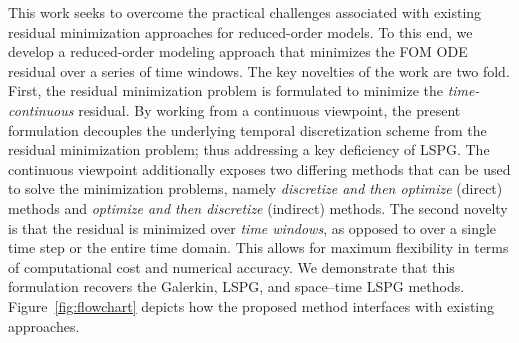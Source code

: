 \documentclass[3p,computermodern,10pt]{elsarticle}
\begin{document}
This work seeks to overcome the practical challenges associated with existing
residual minimization approaches for reduced-order models. To this end, we
develop a reduced-order modeling approach that minimizes the FOM ODE residual
over a series of time windows. The key novelties of the work are two fold.
First, the residual minimization problem is formulated to minimize the
\textit{time-continuous} residual. By working from a continuous viewpoint, the
present formulation decouples the underlying temporal discretization scheme
from the residual minimization problem; thus addressing a key deficiency of
LSPG. The continuous viewpoint additionally exposes two differing methods that
can be used to solve the minimization problems, namely \textit{discretize and
then optimize} (direct) methods and \textit{optimize and then discretize}
(indirect) methods. The second novelty is that the residual is minimized over
\textit{time windows}, as opposed to over a single time step or the entire
time domain. This allows for maximum flexibility in terms of computational
cost and numerical accuracy. We demonstrate that this formulation recovers the
Galerkin, LSPG, and space--time LSPG methods. Figure~\ref{fig:flowchart}
depicts how the proposed method interfaces with existing approaches. 
\end{document}
